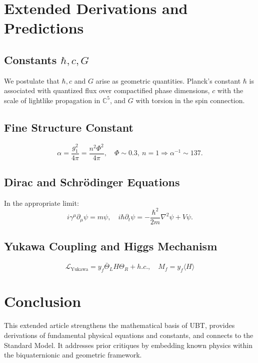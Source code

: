 \documentclass[12pt]{article}
\begin{document}
\section{Extended Derivations and Predictions}
\subsection{Constants \( \hbar, c, G \)}
We postulate that \( \hbar, c \) and \( G \) arise as geometric quantities. Planck’s constant \( \hbar \) is associated with quantized flux over compactified phase dimensions, \( c \) with the scale of lightlike propagation in \( \mathbb{C}^5 \), and \( G \) with torsion in the spin connection.

\subsection{Fine Structure Constant}
\[
\alpha = \frac{g_1^2}{4\pi} = \frac{n^2 \Phi^2}{4\pi}, \quad \Phi \sim 0.3, \ n=1 \Rightarrow \alpha^{-1} \sim 137.
\]

\subsection{Dirac and Schrödinger Equations}
In the appropriate limit:
\[
i \gamma^\mu \partial_\mu \psi = m \psi, \quad i \hbar \partial_t \psi = -\frac{\hbar^2}{2m} \nabla^2 \psi + V \psi.
\]

\subsection{Yukawa Coupling and Higgs Mechanism}
\[
\mathcal{L}_\text{Yukawa} = y_f \bar{\Theta}_L H \Theta_R + h.c., \quad M_f = y_f \langle H \rangle
\]

\section{Conclusion}
This extended article strengthens the mathematical basis of UBT, provides derivations of fundamental physical equations and constants, and connects to the Standard Model. It addresses prior critiques by embedding known physics within the biquaternionic and geometric framework.
\end{document}
